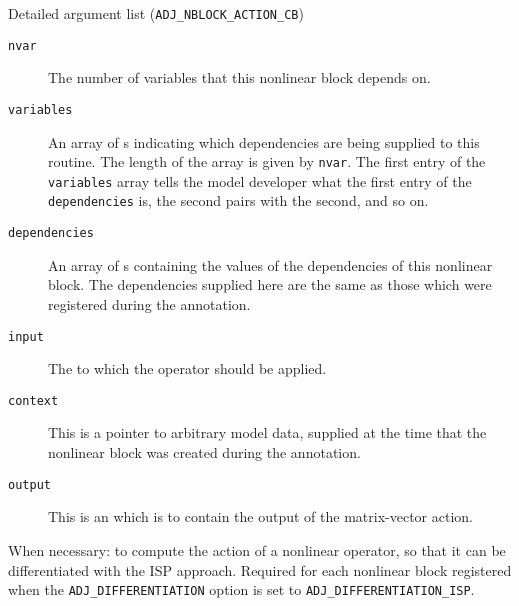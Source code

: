 \begin{boxwithtitle}{Detailed argument list (\texttt{ADJ_NBLOCK_ACTION_CB})}
\begin{description}
\item[\texttt{nvar}] The number of variables that this nonlinear block depends on.
\item[\texttt{variables}] An array of s indicating which dependencies are being supplied to this routine. The length of the
array is given by \texttt{nvar}. The first entry of the \texttt{variables} array
tells the model developer what the first entry of the \texttt{dependencies} is, the second pairs with the second, and so on.
\item[\texttt{dependencies}] An array of s containing the values of the dependencies of this nonlinear block. The dependencies supplied
here are the same as those which were registered during the annotation.
\item[\texttt{input}] The  to which the operator should be applied.
\item[\texttt{context}] This is a pointer to arbitrary model data, supplied at the time that the nonlinear block was created during the annotation.
\item[\texttt{output}] This is an  which is to contain the output of the matrix-vector action.
\end{description}
\end{boxwithtitle}

When necessary: 
to compute the action of a nonlinear operator, so that it can be differentiated
with the ISP approach.
Required for each nonlinear block registered when the \texttt{ADJ_DIFFERENTIATION} option is set to \texttt{ADJ_DIFFERENTIATION_ISP}.



